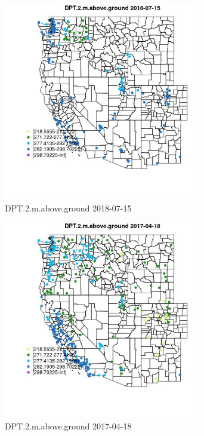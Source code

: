 \begin{figure} 
\centering  
\includegraphics[width=0.77\textwidth]{Code_Outputs/Report_ML_input_PM25_Step4_part_e_de_duplicated_aves_compiled_2019-05-21wNAs_MapObsDPT2maboveground2018-07-15.jpg} 
\caption{\label{fig:Report_ML_input_PM25_Step4_part_e_de_duplicated_aves_compiled_2019-05-21wNAsMapObsDPT2maboveground2018-07-15}DPT.2.m.above.ground 2018-07-15} 
\end{figure} 
 

\begin{figure} 
\centering  
\includegraphics[width=0.77\textwidth]{Code_Outputs/Report_ML_input_PM25_Step4_part_e_de_duplicated_aves_compiled_2019-05-21wNAs_MapObsDPT2maboveground2017-04-18.jpg} 
\caption{\label{fig:Report_ML_input_PM25_Step4_part_e_de_duplicated_aves_compiled_2019-05-21wNAsMapObsDPT2maboveground2017-04-18}DPT.2.m.above.ground 2017-04-18} 
\end{figure} 
 


